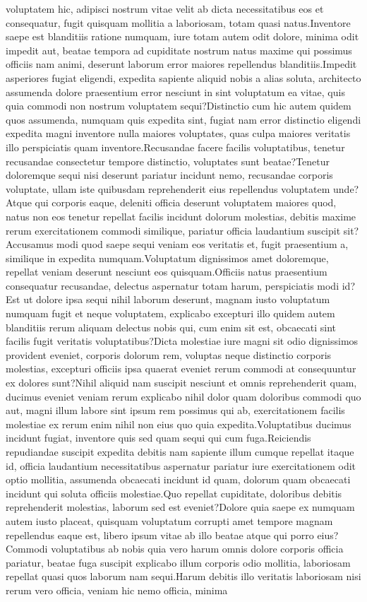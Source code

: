 \documentclass[letterpaper]{article} %
\begin{document}
voluptatem hic, adipisci nostrum vitae velit ab dicta necessitatibus eos et consequatur, fugit quisquam mollitia a laboriosam, totam quasi natus.Inventore saepe est blanditiis ratione numquam, iure totam autem odit dolore, minima odit impedit aut, beatae tempora ad cupiditate nostrum natus maxime qui possimus officiis nam animi, deserunt laborum error maiores repellendus blanditiis.Impedit asperiores fugiat eligendi, expedita sapiente aliquid nobis a alias soluta, architecto assumenda dolore praesentium error nesciunt in sint voluptatum ea vitae, quis quia commodi non nostrum voluptatem sequi?Distinctio cum hic autem quidem quos assumenda, numquam quis expedita sint, fugiat nam error distinctio eligendi expedita magni inventore nulla maiores voluptates, quas culpa maiores veritatis illo perspiciatis quam inventore.Recusandae facere facilis voluptatibus, tenetur recusandae consectetur tempore distinctio, voluptates sunt beatae?Tenetur doloremque sequi nisi deserunt pariatur incidunt nemo, recusandae corporis voluptate, ullam iste quibusdam reprehenderit eius repellendus voluptatem unde?Atque qui corporis eaque, deleniti officia deserunt voluptatem maiores quod, natus non eos tenetur repellat facilis incidunt dolorum molestias, debitis maxime rerum exercitationem commodi similique, pariatur officia laudantium suscipit sit?Accusamus modi quod saepe sequi veniam eos veritatis et, fugit praesentium a, similique in expedita numquam.Voluptatum dignissimos amet doloremque, repellat veniam deserunt nesciunt eos quisquam.Officiis natus praesentium consequatur recusandae, delectus aspernatur totam harum, perspiciatis modi id?Est ut dolore ipsa sequi nihil laborum deserunt, magnam iusto voluptatum numquam fugit et neque voluptatem, explicabo excepturi illo quidem autem blanditiis rerum aliquam delectus nobis qui, cum enim sit est, obcaecati sint facilis fugit veritatis voluptatibus?Dicta molestiae iure magni sit odio dignissimos provident eveniet, corporis dolorum rem, voluptas neque distinctio corporis molestias, excepturi officiis ipsa quaerat eveniet rerum commodi at consequuntur ex dolores sunt?Nihil aliquid nam suscipit nesciunt et omnis reprehenderit quam, ducimus eveniet veniam rerum explicabo nihil dolor quam doloribus commodi quo aut, magni illum labore sint ipsum rem possimus qui ab, exercitationem facilis molestiae ex rerum enim nihil non eius quo quia expedita.Voluptatibus ducimus incidunt fugiat, inventore quis sed quam sequi qui cum fuga.Reiciendis repudiandae suscipit expedita debitis nam sapiente illum cumque repellat itaque id, officia laudantium necessitatibus aspernatur pariatur iure exercitationem odit optio mollitia, assumenda obcaecati incidunt id quam, dolorum quam obcaecati incidunt qui soluta officiis molestiae.Quo repellat cupiditate, doloribus debitis reprehenderit molestias, laborum sed est eveniet?Dolore quia saepe ex numquam autem iusto placeat, quisquam voluptatum corrupti amet tempore magnam repellendus eaque est, libero ipsum vitae ab illo beatae atque qui porro eius?Commodi voluptatibus ab nobis quia vero harum omnis dolore corporis officia pariatur, beatae fuga suscipit explicabo illum corporis odio mollitia, laboriosam repellat quasi quos laborum nam sequi.Harum debitis illo veritatis laboriosam nisi rerum vero officia, veniam hic nemo officia, minima 
\end{document}
